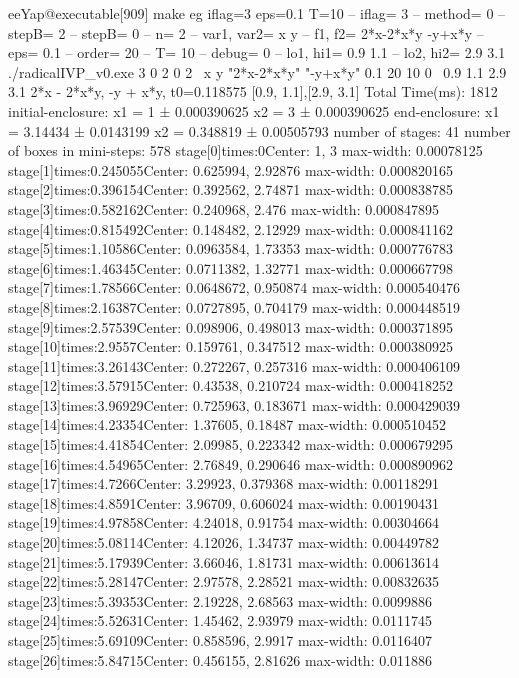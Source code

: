 eeYap@executable[909] make eg iflag=3 eps=0.1 T=10
        -- iflag= 3
        -- method= 0
        -- stepB= 2
        -- stepB= 0
        -- n= 2
        -- var1, var2= x y
        -- f1, f2= 2*x-2*x*y -y+x*y
        -- eps= 0.1
        -- order= 20
        -- T= 10
        -- debug= 0
        -- lo1, hi1= 0.9 1.1
        -- lo2, hi2= 2.9 3.1
./radicalIVP_v0.exe 3 0 2 0 2 \
x y "2*x-2*x*y" "-y+x*y" 0.1 20 10 0 \
0.9 1.1 2.9 3.1
{2*x - 2*x*y, -y + x*y, }
t0=0.118575
{[0.9, 1.1],[2.9, 3.1]}
Total Time(ms): 1812
initial-enclosure:
  x1 = 1 ± 0.000390625
  x2 = 3 ± 0.000390625
end-enclosure:
  x1 = 3.14434 ± 0.0143199
  x2 = 0.348819 ± 0.00505793
number of stages: 41
number of boxes in mini-steps: 578
stage[0]times:0Center:{ 1, 3 } max-width: 0.00078125
stage[1]times:0.245055Center:{ 0.625994, 2.92876 } max-width: 0.000820165
stage[2]times:0.396154Center:{ 0.392562, 2.74871 } max-width: 0.000838785
stage[3]times:0.582162Center:{ 0.240968, 2.476 } max-width: 0.000847895
stage[4]times:0.815492Center:{ 0.148482, 2.12929 } max-width: 0.000841162
stage[5]times:1.10586Center:{ 0.0963584, 1.73353 } max-width: 0.000776783
stage[6]times:1.46345Center:{ 0.0711382, 1.32771 } max-width: 0.000667798
stage[7]times:1.78566Center:{ 0.0648672, 0.950874 } max-width: 0.000540476
stage[8]times:2.16387Center:{ 0.0727895, 0.704179 } max-width: 0.000448519
stage[9]times:2.57539Center:{ 0.098906, 0.498013 } max-width: 0.000371895
stage[10]times:2.9557Center:{ 0.159761, 0.347512 } max-width: 0.000380925
stage[11]times:3.26143Center:{ 0.272267, 0.257316 } max-width: 0.000406109
stage[12]times:3.57915Center:{ 0.43538, 0.210724 } max-width: 0.000418252
stage[13]times:3.96929Center:{ 0.725963, 0.183671 } max-width: 0.000429039
stage[14]times:4.23354Center:{ 1.37605, 0.18487 } max-width: 0.000510452
stage[15]times:4.41854Center:{ 2.09985, 0.223342 } max-width: 0.000679295
stage[16]times:4.54965Center:{ 2.76849, 0.290646 } max-width: 0.000890962
stage[17]times:4.7266Center:{ 3.29923, 0.379368 } max-width: 0.00118291
stage[18]times:4.8591Center:{ 3.96709, 0.606024 } max-width: 0.00190431
stage[19]times:4.97858Center:{ 4.24018, 0.91754 } max-width: 0.00304664
stage[20]times:5.08114Center:{ 4.12026, 1.34737 } max-width: 0.00449782
stage[21]times:5.17939Center:{ 3.66046, 1.81731 } max-width: 0.00613614
stage[22]times:5.28147Center:{ 2.97578, 2.28521 } max-width: 0.00832635
stage[23]times:5.39353Center:{ 2.19228, 2.68563 } max-width: 0.0099886
stage[24]times:5.52631Center:{ 1.45462, 2.93979 } max-width: 0.0111745
stage[25]times:5.69109Center:{ 0.858596, 2.9917 } max-width: 0.0116407
stage[26]times:5.84715Center:{ 0.456155, 2.81626 } max-width: 0.011886
